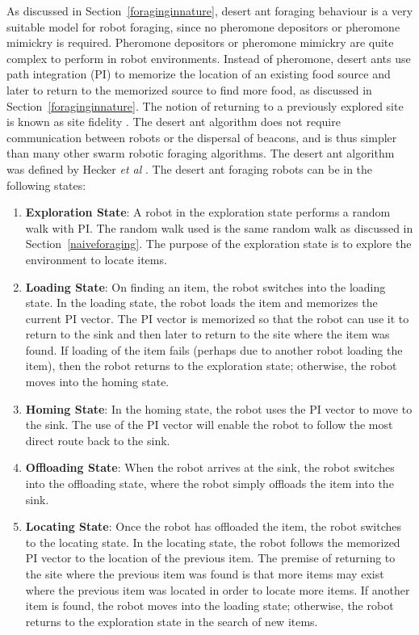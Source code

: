 \documentclass[preprint,12pt]{elsarticle}
\begin{document}
As discussed in Section~\ref{foraginginnature}, desert ant foraging behaviour is a very suitable model for robot foraging, since no pheromone depositors or pheromone mimickry is required. Pheromone depositors or pheromone mimickry are quite complex to perform in robot environments. Instead of pheromone, desert ants use path integration (PI) to memorize the location of an existing food source and later to return to the memorized source to find more food, as discussed in Section~\ref{foraginginnature}. The notion of returning to a previously explored site is known as site fidelity \cite{switzer1993site}. The desert ant algorithm does not require communication between robots or the dispersal of beacons, and is thus simpler than many other swarm robotic foraging algorithms. The desert ant algorithm was defined by Hecker \textit{et al} \cite{hecker2012formica}. The desert ant foraging robots can be in the following states:

\begin{enumerate}
	\item\textbf{Exploration State}: A robot in the exploration state performs a random walk with PI. The random walk used is the same random walk as discussed in Section~\ref{naiveforaging}. The purpose of the exploration state is to explore the environment to locate items. 
	\item\textbf{Loading State}: On finding an item, the robot switches into the loading state. In the loading state, the robot loads the item and memorizes the current PI vector. The PI vector is memorized so that the robot can use it to return to the sink and then later to return to the site where the item was found. If loading of the item fails (perhaps due to another robot loading the item), then the robot returns to the exploration state; otherwise, the robot moves into the homing state.
	\item\textbf{Homing State}: In the homing state, the robot uses the PI vector to move to the sink. The use of the PI vector will enable the robot to follow the most direct route back to the sink.
	\item\textbf{Offloading State}: When the robot arrives at the sink, the robot switches into the offloading state, where the robot simply offloads the item into the sink. 
	\item\textbf{Locating State}: Once the robot has offloaded the item, the robot switches to the locating state. In the locating state, the robot follows the memorized PI vector to the location of the previous item. The premise of returning to the site where the previous item was found is that more items may exist where the previous item was located in order to locate more items. If another item is found, the robot moves into the loading state; otherwise, the robot returns to the exploration state in the search of new items. 
\end{enumerate}
\end{document}
